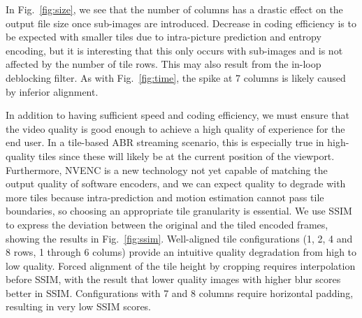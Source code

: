 
In Fig.~\ref{fig:size}, we see that the number of columns has a drastic effect on the output file size once sub-images are introduced. Decrease in coding efficiency is to be expected with smaller tiles due to intra-picture prediction and entropy encoding, but it is interesting that this only occurs with sub-images and is not affected by the number of tile rows.
This may also result from the in-loop deblocking filter.
As with Fig.~\ref{fig:time}, the spike at 7 columns is likely caused by inferior alignment.

In addition to having sufficient speed and coding efficiency, we must ensure that the video quality is good enough to achieve a high quality of experience for the end user.
In a tile-based ABR streaming scenario, this is especially true in high-quality tiles since these will likely be at the current position of the viewport.
Furthermore, NVENC is a new technology not yet capable of matching the output quality of software encoders, and we can expect quality to degrade with more tiles because intra-prediction and motion estimation cannot pass tile boundaries, so choosing an appropriate tile granularity is essential.
We use SSIM to express the deviation between the original and the tiled encoded frames, showing the results in Fig.~\ref{fig:ssim}.
Well-aligned tile configurations (1, 2, 4 and 8 rows, 1 through 6 colums) provide an intuitive quality degradation from high to low quality. Forced alignment of the tile height by cropping requires interpolation before SSIM, with the result that lower quality images with higher blur scores better in SSIM. Configurations with 7 and 8 columns require horizontal padding, resulting in very low SSIM scores.


